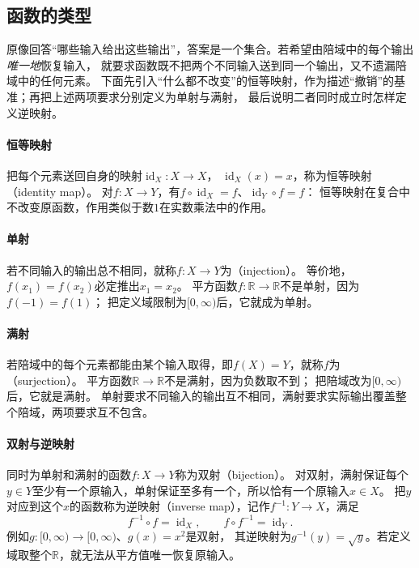 \subsection{函数的类型}
\label{sec:prelim-function-types}

原像回答“哪些输入给出这些输出”，答案是一个集合。若希望由陪域中的每个输出\emph{唯一地}恢复输入，
就要求函数既不把两个不同输入送到同一个输出，又不遗漏陪域中的任何元素。
下面先引入“什么都不改变”的恒等映射，作为描述“撤销”的基准；再把上述两项要求分别定义为单射与满射，
最后说明二者同时成立时怎样定义逆映射。

\paragraph{恒等映射}
把每个元素送回自身的映射$\operatorname{id}_X:X\to X$，
$\operatorname{id}_X(x)=x$，称为恒等映射（identity map）。
对$f:X\to Y$，有$f\circ\operatorname{id}_X=f$、$\operatorname{id}_Y\circ f=f$：
恒等映射在复合中不改变原函数，作用类似于数$1$在实数乘法中的作用。

\paragraph{单射}
若不同输入的输出总不相同，就称$f:X\to Y$为（injection）。
等价地，$f(x_1)=f(x_2)$必定推出$x_1=x_2$。
平方函数$f:\mathbb R\to\mathbb R$不是单射，因为$f(-1)=f(1)$；
把定义域限制为$[0,\infty)$后，它就成为单射。

\paragraph{满射}
若陪域中的每个元素都能由某个输入取得，即$f(X)=Y$，就称$f$为（surjection）。
平方函数$\mathbb R\to\mathbb R$不是满射，因为负数取不到；
把陪域改为$[0,\infty)$后，它就是满射。
单射要求不同输入的输出互不相同，满射要求实际输出覆盖整个陪域，两项要求互不包含。

\paragraph{双射与逆映射}
\label{def:prelim-invertible-map}
同时为单射和满射的函数$f:X\to Y$称为双射（bijection）。
对双射，满射保证每个$y\in Y$至少有一个原输入，单射保证至多有一个，所以恰有一个原输入$x\in X$。
把$y$对应到这个$x$的函数称为逆映射（inverse map），记作$f^{-1}:Y\to X$，满足
\[
 f^{-1}\circ f=\operatorname{id}_X,\qquad
 f\circ f^{-1}=\operatorname{id}_Y.
\]
例如$g:[0,\infty)\to[0,\infty)$、$g(x)=x^2$是双射，
其逆映射为$g^{-1}(y)=\sqrt y$。若定义域取整个$\mathbb R$，就无法从平方值唯一恢复原输入。

